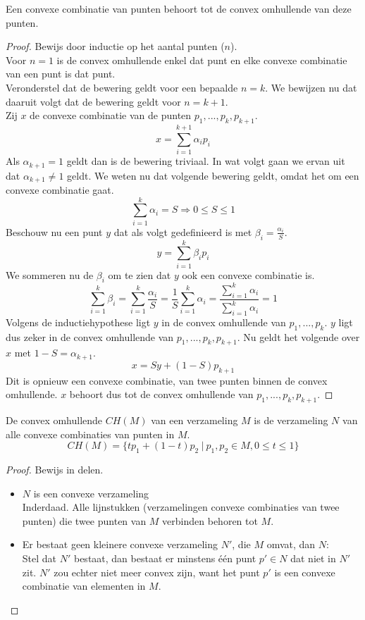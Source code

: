 \documentclass[computergesteund_ontwerp_van_curven_en_oppervlakken.tex]{subfiles}
\begin{document}
\begin{st}
Een convexe combinatie van punten behoort tot de convex omhullende van deze punten.
\begin{proof}
Bewijs door inductie op het aantal punten ($n$).\\
Voor $n=1$ is de convex omhullende enkel dat punt en elke convexe combinatie van een punt is dat punt.\\
Veronderstel dat de bewering geldt voor een bepaalde $n=k$. We bewijzen nu dat daaruit volgt dat de bewering geldt voor $n=k+1$.\\
Zij $x$ de convexe combinatie van de punten $p_1,...,p_k,p_{k+1}$.
\[
x = \sum_{i=1}^{k+1}\alpha_ip_i
\]
Als $\alpha_{k+1} = 1$ geldt dan is de bewering triviaal. In wat volgt gaan we ervan uit dat $\alpha_{k+1} \neq 1$ geldt.
We weten nu dat volgende bewering geldt, omdat het om een convexe combinatie gaat.
\[
\sum_{i=1}^{k}\alpha_i = S \Rightarrow 0 \le S \le 1
\]
Beschouw nu een punt $y$ dat als volgt gedefinieerd is met $\beta_i = \frac{\alpha_i}{S}$.
\[
y = \sum_{i=1}^k\beta_{i}p_{i}
\]
We sommeren nu de $\beta_i$ om te zien dat $y$ ook een convexe combinatie is.
\[
\sum_{i=1}^k\beta_{i} = \sum_{i=1}^k \frac{\alpha_i}{S} = \frac{1}{S}\sum_{i=1}^k \alpha_i = \frac{\sum_{i=1}^{k}\alpha_i}{\sum_{i=1}^{k}\alpha_i} = 1
\]
Volgens de inductiehypothese ligt $y$ in de convex omhullende van $p_1,...,p_k$. $y$ ligt dus zeker in de convex omhullende van $p_1,...,p_k,p_{k+1}$. Nu geldt het volgende over $x$ met $1-S = \alpha_{k+1}$.
\[
x = Sy + (1-S)p_{k+1}
\]
Dit is opnieuw een convexe combinatie, van twee punten binnen de convex omhullende. $x$ behoort dus tot de convex omhullende van $p_1,...,p_k,p_{k+1}$. 
\end{proof}
\end{st}
\begin{st}
\label{combinatie_in_omhullende}
De convex omhullende $CH(M)$ van een verzameling $M$ is de verzameling $N$ van alle convexe combinaties van punten in $M$.
\[
CH(M) = \{ tp_1 + (1-t)p_2\ |\ p_1,p_2 \in M, 0\le t \le 1\}
\]
\begin{proof} Bewijs in delen.
\begin{itemize}
\item $N$ is een convexe verzameling\\ Inderdaad. Alle lijnstukken (verzamelingen convexe combinaties van twee punten)  die twee punten van $M$ verbinden behoren tot $M$.
\item Er bestaat geen kleinere convexe verzameling $N'$, die $M$ omvat, dan $N$:\\
Stel dat $N'$ bestaat, dan bestaat er minstens \'e\'en punt $p' \in N$ dat niet in $N'$ zit. $N'$ zou echter niet meer convex zijn, want het punt $p'$ is een convexe combinatie van elementen in $M$.
\end{itemize}
\end{proof}
\end{st}
\end{document}
